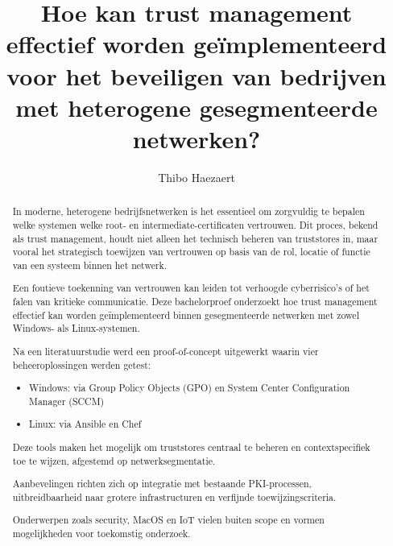 \documentclass[a0,portrait]{hogent-poster}
\title{Hoe kan trust management effectief worden geïmplementeerd voor het beveiligen van bedrijven met heterogene gesegmenteerde netwerken?}
\author{Thibo Haezaert}
\begin{document}
\maketitle

\begin{abstract}
In moderne, heterogene bedrijfsnetwerken is het essentieel om zorgvuldig te bepalen welke systemen welke root- en intermediate-certificaten vertrouwen. Dit proces, bekend als trust management, houdt niet alleen het technisch beheren van truststores in, maar vooral het strategisch toewijzen van vertrouwen op basis van de rol, locatie of functie van een systeem binnen het netwerk.

Een foutieve toekenning van vertrouwen kan leiden tot verhoogde cyberrisico’s of het falen van kritieke communicatie. Deze bachelorproef onderzoekt hoe trust management effectief kan worden geïmplementeerd binnen gesegmenteerde netwerken met zowel Windows- als Linux-systemen.

Na een literatuurstudie werd een proof-of-concept uitgewerkt waarin vier beheeroplossingen werden getest:

\begin{itemize}
  \item Windows: via Group Policy Objects (GPO) en System Center Configuration Manager (SCCM)
  \item Linux: via Ansible en Chef
\end{itemize}

Deze tools maken het mogelijk om truststores centraal te beheren en contextspecifiek toe te wijzen, afgestemd op netwerksegmentatie.

Aanbevelingen richten zich op integratie met bestaande PKI-processen, uitbreidbaarheid naar grotere infrastructuren en verfijnde toewijzingscriteria.

Onderwerpen zoals security, MacOS en IoT vielen buiten scope en vormen mogelijkheden voor toekomstig onderzoek.
\end{abstract}
\end{document}
